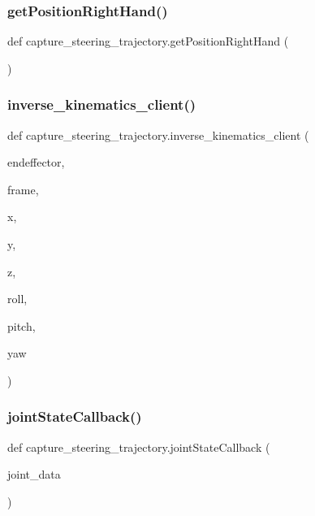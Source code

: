 \subsubsection{\texorpdfstring{getPositionRightHand()}{getPositionRightHand()}}
{\footnotesize\ttfamily def capture\+\_\+steering\+\_\+trajectory.\+get\+Position\+Right\+Hand (\begin{DoxyParamCaption}{ }\end{DoxyParamCaption})}

\mbox{\label{namespacecapture__steering__trajectory_acc20e7be007d128cc6c9f6a2a32b6c0f}} 
\subsubsection{\texorpdfstring{inverse\_kinematics\_client()}{inverse\_kinematics\_client()}}
{\footnotesize\ttfamily def capture\+\_\+steering\+\_\+trajectory.\+inverse\+\_\+kinematics\+\_\+client (\begin{DoxyParamCaption}\item[{}]{endeffector,  }\item[{}]{frame,  }\item[{}]{x,  }\item[{}]{y,  }\item[{}]{z,  }\item[{}]{roll,  }\item[{}]{pitch,  }\item[{}]{yaw }\end{DoxyParamCaption})}

\mbox{\label{namespacecapture__steering__trajectory_a09692875ec7c7738291da8fee8480bca}} 
\subsubsection{\texorpdfstring{jointStateCallback()}{jointStateCallback()}}
{\footnotesize\ttfamily def capture\+\_\+steering\+\_\+trajectory.\+joint\+State\+Callback (\begin{DoxyParamCaption}\item[{}]{joint\+\_\+data }\end{DoxyParamCaption})}

